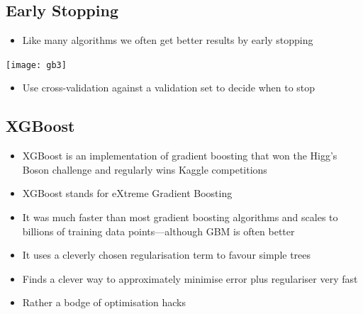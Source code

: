 
\begin{slide}
\section{Early Stopping}

\pb
\begin{itemize}
\item Like many algorithms we often get better results by early
  stopping\pauseh
\end{itemize}
\begin{center}
  \texttt{[image: gb3]}
\end{center}
\begin{itemize}
\item Use cross-validation against a validation set to decide when to
  stop\pauseh
\end{itemize}

\end{slide}


\begin{slide}
\section[-2]{XGBoost}

\begin{PauseHighLight}
  \begin{itemize}
  \item XGBoost is an implementation of gradient boosting that won the
    Higg's Boson challenge and regularly wins Kaggle competitions\pause
  \item XGBoost stands for eXtreme Gradient Boosting\pause
  \item It was much faster than most gradient boosting algorithms and
    scales to billions of training data points---although GBM is often
    better\pause
  \item It uses a cleverly chosen regularisation term to favour simple
    trees\pause
  \item Finds a clever way to approximately minimise error plus
    regulariser very fast\pause
  \item Rather a bodge of optimisation hacks\pauseb
  \end{itemize}
\end{PauseHighLight}


\end{slide}

